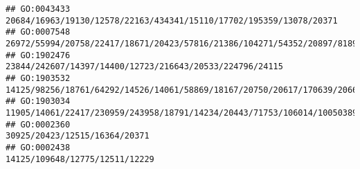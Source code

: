 \documentclass[
]{article}
\begin{document}
\begin{verbatim}
## GO:0043433                                                                                                                                                                                                                                                                                                                                          20684/16963/19130/12578/22163/434341/15110/17702/195359/13078/20371
## GO:0007548                                                                                                                                                                                                                                                                                     26972/55994/20758/22417/18671/20423/57816/21386/104271/54352/20897/81897/20474/73296/14165/18095/13134/13078/14585/93837
## GO:1902476                                                                                                                                                                                                                                                                                                                                                     23844/242607/14397/14400/12723/216643/20533/224796/24115
## GO:1903532                                                                                                                                                                                                                                                                               14125/98256/18761/64292/14526/14061/58869/18167/20750/20617/170639/20666/27062/12143/18095/21943/81799/22337/58226/14419/14126
## GO:1903034                                                                                                                                                                                                                                                                                                                               11905/14061/22417/230959/243958/18791/14234/20443/71753/106014/100503895/11551
## GO:0002360                                                                                                                                                                                                                                                                                                                                                                                30925/20423/12515/16364/20371
## GO:0002438                                                                                                                                                                                                                                                                                                                                                                               14125/109648/12775/12511/12229

\end{verbatim}
\end{document}
